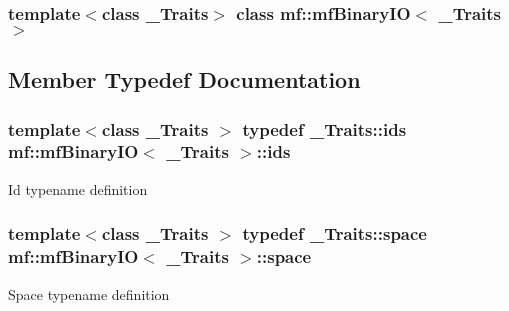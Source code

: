 \subsubsection*{template$<$class \_\-Traits$>$ class mf::mfBinaryIO$<$ \_\-Traits $>$}



\subsection{Member Typedef Documentation}
\hypertarget{classmf_1_1mfBinaryIO_a2e229a9a1a64191bfe2bda80a9328714}{
\subsubsection[{ids}]{\setlength{\rightskip}{0pt plus 5cm}template$<$class \_\-Traits $>$ typedef \_\-Traits::ids {\bf mf::mfBinaryIO}$<$ \_\-Traits $>$::{\bf ids}}}
\label{classmf_1_1mfBinaryIO_a2e229a9a1a64191bfe2bda80a9328714}
Id typename definition \hypertarget{classmf_1_1mfBinaryIO_a90e373b679656da911855f0f855f8dc8}{
\subsubsection[{space}]{\setlength{\rightskip}{0pt plus 5cm}template$<$class \_\-Traits $>$ typedef \_\-Traits::space {\bf mf::mfBinaryIO}$<$ \_\-Traits $>$::{\bf space}}}
\label{classmf_1_1mfBinaryIO_a90e373b679656da911855f0f855f8dc8}
Space typename definition 

